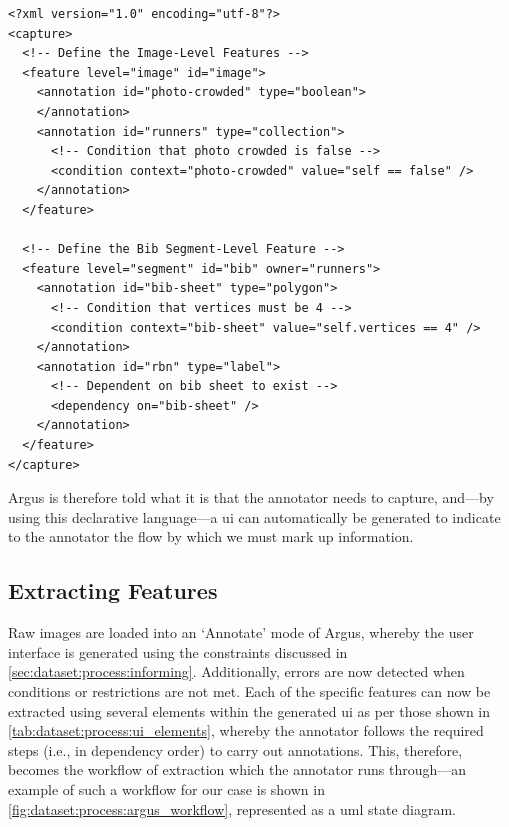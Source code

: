 \begin{lstlisting}[language=ACL, label=lst:dataset:process:acl_sample, caption={[Sample Argus Constraint Language File Format] An \glsx{acl} file describing the image-level and $BibSheet$ segment-level features as represented in an \glsac{xml} schema.}]
<?xml version="1.0" encoding="utf-8"?>
<capture>
  <!-- Define the Image-Level Features -->
  <feature level="image" id="image">
    <annotation id="photo-crowded" type="boolean">
    </annotation>
    <annotation id="runners" type="collection">
      <!-- Condition that photo crowded is false -->
      <condition context="photo-crowded" value="self == false" />
    </annotation>
  </feature>
  
  <!-- Define the Bib Segment-Level Feature -->
  <feature level="segment" id="bib" owner="runners">
    <annotation id="bib-sheet" type="polygon">
      <!-- Condition that vertices must be 4 -->
      <condition context="bib-sheet" value="self.vertices == 4" />
    </annotation>
    <annotation id="rbn" type="label">
      <!-- Dependent on bib sheet to exist -->
      <dependency on="bib-sheet" />
    </annotation>
  </feature>
</capture>
\end{lstlisting}

Argus is therefore told what it is that the annotator needs to capture, and---by using this declarative language---a \gls{ui} can automatically be generated to indicate to the annotator the flow by which we must mark up information. 

\subsection{Extracting Features}
\label{sec:dataset:process:extracting}

Raw images are loaded into an `Annotate' mode of Argus, whereby the user interface is generated using the constraints discussed in \cref{sec:dataset:process:informing}. Additionally, errors are now detected when conditions or restrictions are not met. Each of the specific features can now be extracted using several elements within the generated \gls{ui} as per those shown in \cref{tab:dataset:process:ui_elements}, whereby the annotator follows the required steps (i.e., in dependency order) to carry out annotations. This, therefore, becomes the workflow of extraction which the annotator runs through---an example of such a workflow for our case is shown in \cref{fig:dataset:process:argus_workflow}, represented as a \gls{uml} state diagram.

